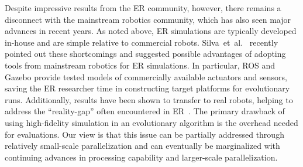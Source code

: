 Despite impressive results from the ER community, however, there remains a disconnect with
the mainstream robotics community, which has also seen major advances in recent years.
As noted above, ER 
simulations are typically developed in-house and are simple relative to commercial robots.
%
%
% 
Silva~et~al.~\cite{Silva.ERissues.2016} recently pointed out these shortcomings and suggested 
possible advantages of adopting tools from mainstream robotics for ER simulations.
In particular, ROS and Gazebo
provide tested models of commercially available actuators and sensors,
saving the ER researcher time in constructing target platforms for evolutionary runs.
Additionally, results have been shown to transfer to real robots, helping
to address the ``reality-gap'' often encountered in ER~\cite{Koos2010}.  
The primary drawback of using high-fidelity simulation in an evolutionary algorithm
is the overhead needed for evaluations.
Our view is that this issue can be partially addressed through 
relatively small-scale parallelization and can eventually be marginalized
with continuing advances in processing capability and larger-scale parallelization.

